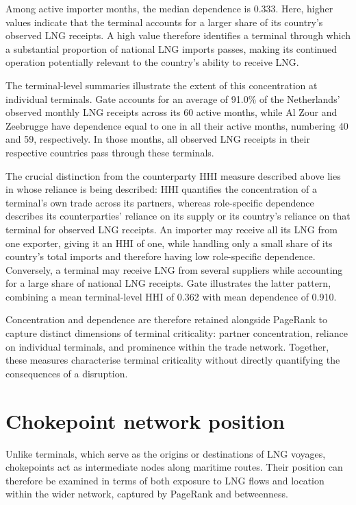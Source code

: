 \documentclass[pdftex,12pt,openright,a4paper,oneside]{book}
\begin{document}
Among active importer months, the median dependence is 0.333. 
Here, higher values indicate that the terminal accounts for a larger share of its country's observed LNG receipts. 
A high value therefore identifies a terminal through which a substantial proportion of national LNG imports passes, making its continued operation potentially relevant to the country's ability to receive LNG.

The terminal-level summaries illustrate the extent of this concentration at individual terminals. Gate accounts for an average of 91.0\% of the Netherlands' observed monthly LNG receipts across its 60 active months, while Al Zour and Zeebrugge have dependence equal to one in all their active months, numbering 40 and 59, respectively. In those months, all observed LNG receipts in their respective countries pass through these terminals.

The crucial distinction from the counterparty HHI measure described above lies in whose reliance is being described: HHI quantifies the concentration of a terminal's own trade across its partners, whereas role-specific dependence describes its counterparties' reliance on its supply or its country's reliance on that terminal for observed LNG receipts.
An importer may receive all its LNG from one exporter, giving it an HHI of one, while handling only a small share of its country's total imports and therefore having low role-specific dependence. 
Conversely, a terminal may receive LNG from several suppliers while accounting for a large share of national LNG receipts. 
Gate illustrates the latter pattern, combining a mean terminal-level HHI of 0.362 with mean dependence of 0.910.

Concentration and dependence are therefore retained alongside PageRank to capture distinct dimensions of terminal criticality: partner concentration, reliance on individual terminals, and prominence within the trade network. 
Together, these measures characterise terminal criticality without directly quantifying the consequences of a disruption.

\section{Chokepoint network position}
\label{sec:chokepoint_network_position}

Unlike terminals, which serve as the origins or destinations of LNG voyages, chokepoints act as intermediate nodes along maritime routes. 
Their position can therefore be examined in terms of both exposure to LNG flows and location within the wider network, captured by PageRank and betweenness.
\end{document}
